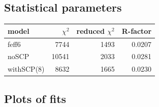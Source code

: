 \documentclass[11pt]{article}
\begin{document}
\subsection{Statistical parameters}
\label{sec:orgheadline33}

\begin{center}
  \begin{tabular}{lrrr}
    model & $\chi^2$ & reduced $\chi^2$ & R-factor\\
    \hline
    feff6      &  7744 & 1493 & 0.0207\\
    noSCP      & 10541 & 2033 & 0.0281\\
    withSCP(8) &  8632 & 1665 & 0.0230\\
  \end{tabular}
\end{center}





\subsection{Plots of fits}
\label{sec:orgheadline35}
\end{document}
